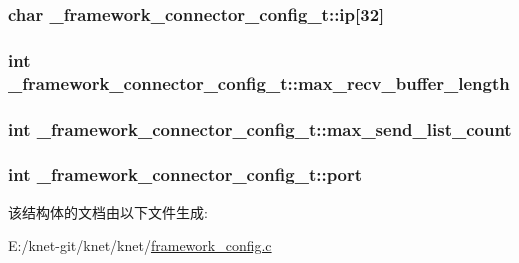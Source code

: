 \subsubsection[{ip}]{\setlength{\rightskip}{0pt plus 5cm}char \+\_\+framework\+\_\+connector\+\_\+config\+\_\+t\+::ip\mbox{[}32\mbox{]}}\label{a00011_a09a135e761eb026e64952e76ca193c1b_a09a135e761eb026e64952e76ca193c1b}
\hypertarget{a00011_a7f803ef991aaf690e9b3585c423511d1_a7f803ef991aaf690e9b3585c423511d1}{}
\subsubsection[{max\+\_\+recv\+\_\+buffer\+\_\+length}]{\setlength{\rightskip}{0pt plus 5cm}int \+\_\+framework\+\_\+connector\+\_\+config\+\_\+t\+::max\+\_\+recv\+\_\+buffer\+\_\+length}\label{a00011_a7f803ef991aaf690e9b3585c423511d1_a7f803ef991aaf690e9b3585c423511d1}
\hypertarget{a00011_ac6e964a4a4ca24a176016275955a4e05_ac6e964a4a4ca24a176016275955a4e05}{}
\subsubsection[{max\+\_\+send\+\_\+list\+\_\+count}]{\setlength{\rightskip}{0pt plus 5cm}int \+\_\+framework\+\_\+connector\+\_\+config\+\_\+t\+::max\+\_\+send\+\_\+list\+\_\+count}\label{a00011_ac6e964a4a4ca24a176016275955a4e05_ac6e964a4a4ca24a176016275955a4e05}
\hypertarget{a00011_a5427527be42630baf3fc0497e74e4d4d_a5427527be42630baf3fc0497e74e4d4d}{}
\subsubsection[{port}]{\setlength{\rightskip}{0pt plus 5cm}int \+\_\+framework\+\_\+connector\+\_\+config\+\_\+t\+::port}\label{a00011_a5427527be42630baf3fc0497e74e4d4d_a5427527be42630baf3fc0497e74e4d4d}


该结构体的文档由以下文件生成\+:\begin{DoxyCompactItemize}
\item 
E\+:/knet-\/git/knet/knet/\hyperlink{a00055}{framework\+\_\+config.\+c}\end{DoxyCompactItemize}
